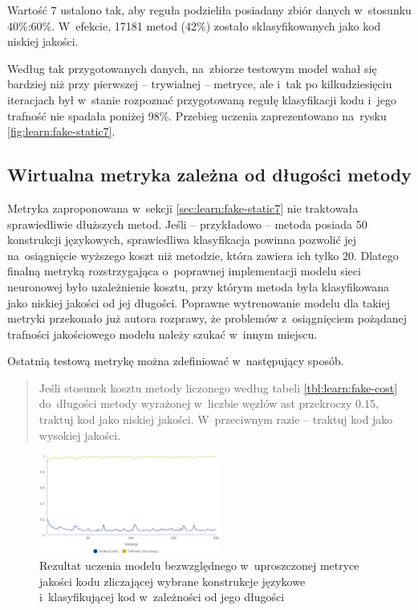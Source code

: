 \documentclass[twoside]{praca}
\begin{document}
Wartość $7$ ustalono tak, aby reguła podzieliła posiadany zbiór danych w~stosunku 40\%:60\%. W~efekcie, 17181 metod (42\%) zostało sklasyfikowanych jako kod niskiej jakości.

Według tak przygotowanych danych, na~zbiorze testowym model wahał się bardziej niż przy pierwszej -- trywialnej -- metryce, ale i~tak po kilkudziesięciu iteracjach był w~stanie rozpoznać przygotowaną regułę klasyfikacji kodu i~jego trafność nie spadała poniżej 98\%. Przebieg uczenia zaprezentowano na~rysku \ref{fig:learn:fake-static7}.

\subsection{Wirtualna metryka zależna od długości metody}

Metryka zaproponowana w~sekcji \ref{sec:learn:fake-static7} nie traktowała sprawiedliwie dłuższych metod. Jeśli -- przykładowo -- metoda posiada 50 konstrukcji językowych, sprawiedliwa klasyfikacja powinna pozwolić jej na~osiągnięcie wyższego koszt niż metodzie, która zawiera ich tylko 20. Dlatego finalną metryką rozstrzygająca o~poprawnej implementacji modelu sieci neuronowej było uzależnienie kosztu, przy którym metoda była klasyfikowana jako niskiej jakości od jej długości. Poprawne wytrenowanie modelu dla takiej metryki przekonało już autora rozprawy, że problemów z~osiągnięciem pożądanej trafności jakościowego modelu należy szukać w~innym miejscu.

Ostatnią testową metrykę można zdefiniować w~następujący sposób.

\begin{quotation}
\noindent Jeśli stosunek kosztu metody liczonego według tabeli \ref{tbl:learn:fake-cost} do~długości metody wyrażonej w~liczbie węzłów \gls{ast} przekroczy $0.15$, traktuj kod jako niskiej jakości. W~przeciwnym razie -- traktuj kod jako wysokiej jakości.
\end{quotation}

\begin{figure}
\centering
\includegraphics[width=0.53\textwidth]{learn/fake-static-15.eps}
\caption{Rezultat uczenia modelu bezwzględnego w~uproszczonej metryce jakości kodu zliczającej wybrane konstrukcje językowe i~klasyfikującej kod w~zależności od jego długości}
\label{fig:learn:fake-static15}
\end{figure}
\end{document}
